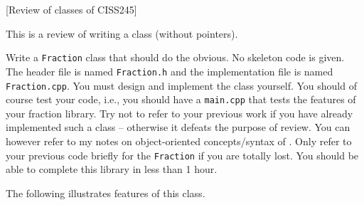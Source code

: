 [Review of classes of CISS245]

This is a review of writing a class (without pointers).

Write a \texttt{Fraction} class that should do the obvious.
No skeleton code is given.
The header file is named \texttt{Fraction.h}
and the implementation file is named \texttt{Fraction.cpp}.
You must design and implement the class yourself.
You should of course test your code, i.e., you should have a
\verb!main.cpp! that tests the features of your fraction library.
Try not to refer to your previous work if you have already implemented
such a class -- otherwise it defeats the purpose of review.
You can however refer to my notes on object-oriented
concepts/syntax of \cpp.
Only refer to your previous code briefly for the \verb!Fraction! if you are
totally lost.
You should be able to complete this library in less than 1 hour.

The following illustrates features of this class.

